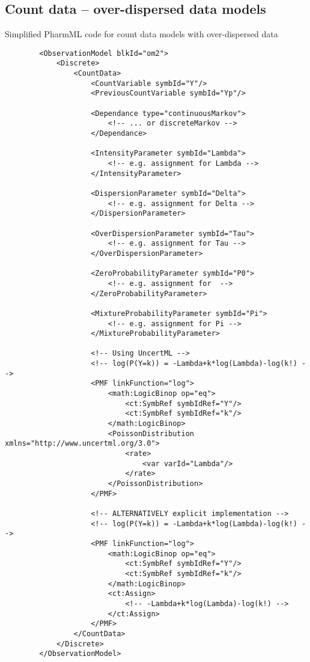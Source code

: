 \subsection{Count data -- over-dispersed data models}
Simplified PharmML code for count data models with over-dispersed data
\lstset{language=XML}
\begin{lstlisting}
        <ObservationModel blkId="om2">
            <Discrete>
                <CountData>
                    <CountVariable symbId="Y"/>
                    <PreviousCountVariable symbId="Yp"/>

                    <Dependance type="continuousMarkov">
                        <!-- ... or discreteMarkov -->
                    </Dependance>
                    
                    <IntensityParameter symbId="Lambda">
                        <!-- e.g. assignment for Lambda -->
                    </IntensityParameter>
                    
                    <DispersionParameter symbId="Delta">
                        <!-- e.g. assignment for Delta -->
                    </DispersionParameter>

                    <OverDispersionParameter symbId="Tau">
                        <!-- e.g. assignment for Tau -->
                    </OverDispersionParameter>
                    
                    <ZeroProbabilityParameter symbId="P0">
                        <!-- e.g. assignment for  -->
                    </ZeroProbabilityParameter>
                    
                    <MixtureProbabilityParameter symbId="Pi">
                        <!-- e.g. assignment for Pi -->
                    </MixtureProbabilityParameter>
                    
                    <!-- Using UncertML -->
                    <!-- log(P(Y=k)) = -Lambda+k*log(Lambda)-log(k!) -->
                    <PMF linkFunction="log">
                        <math:LogicBinop op="eq">
                            <ct:SymbRef symbIdRef="Y"/>
                            <ct:SymbRef symbIdRef="k"/>
                        </math:LogicBinop>
                        <PoissonDistribution xmlns="http://www.uncertml.org/3.0">
                            <rate>
                                <var varId="Lambda"/>
                            </rate>
                        </PoissonDistribution>
                    </PMF>
                    
                    <!-- ALTERNATIVELY explicit implementation -->
                    <!-- log(P(Y=k)) = -Lambda+k*log(Lambda)-log(k!) -->
                    <PMF linkFunction="log">
                        <math:LogicBinop op="eq">
                            <ct:SymbRef symbIdRef="Y"/>
                            <ct:SymbRef symbIdRef="k"/>
                        </math:LogicBinop>
                        <ct:Assign>
                            <!-- -Lambda+k*log(Lambda)-log(k!) -->
                        </ct:Assign>
                    </PMF>
                </CountData>
            </Discrete>
        </ObservationModel>
\end{lstlisting}
